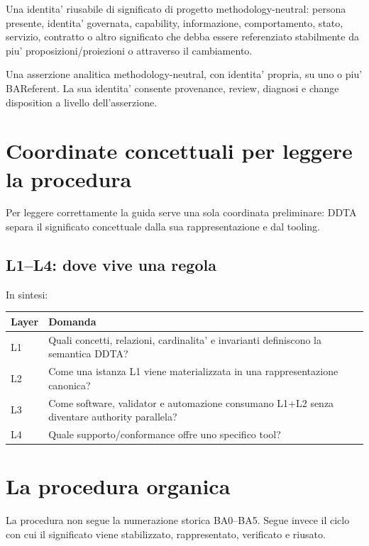 \documentclass[11pt,a4paper]{article}
\begin{document}
\begin{conceptbox}[BAReferent]
Una identita' riusabile di significato di progetto methodology-neutral: persona presente, identita' governata, capability, informazione, comportamento, stato, servizio, contratto o altro significato che debba essere referenziato stabilmente da piu' proposizioni/proiezioni o attraverso il cambiamento.
\end{conceptbox}

\begin{conceptbox}[BAProposition]
Una asserzione analitica methodology-neutral, con identita' propria, su uno o piu' BAReferent. La sua identita' consente provenance, review, diagnosi e change disposition a livello dell'asserzione.
\end{conceptbox}


\section{Coordinate concettuali per leggere la procedura}

Per leggere correttamente la guida serve una sola coordinata preliminare: DDTA separa il significato concettuale dalla sua rappresentazione e dal tooling.

\subsection{L1--L4: dove vive una regola}

In sintesi:

\begin{longtable}{L{0.12\textwidth}L{0.76\textwidth}}
\toprule
\textbf{Layer} & \textbf{Domanda} \\
\midrule\endhead
L1 & Quali concetti, relazioni, cardinalita' e invarianti definiscono la semantica DDTA? \\
L2 & Come una istanza L1 viene materializzata in una rappresentazione canonica? \\
L3 & Come software, validator e automazione consumano L1+L2 senza diventare authority parallela? \\
L4 & Quale supporto/conformance offre uno specifico tool? \\
\bottomrule
\end{longtable}


\section{La procedura organica}
La procedura non segue la numerazione storica BA0--BA5. Segue invece il ciclo con cui il significato viene stabilizzato, rappresentato, verificato e riusato.
\end{document}
